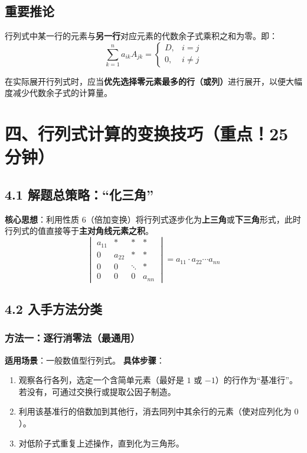 \documentclass{ctexart}
\begin{document}
\subsection{重要推论}
行列式中某一行的元素与\textbf{另一行}对应元素的代数余子式乘积之和为零。即：
\[
\sum_{k=1}^{n} a_{ik}A_{jk} = \begin{cases} D, & i=j \\ 0, & i \neq j \end{cases}
\]

\begin{tipbox}
  在实际展开行列式时，应当\textbf{优先选择零元素最多的行（或列）}进行展开，以便大幅度减少代数余子式的计算量。
\end{tipbox}

\newpage

\section{四、行列式计算的变换技巧（重点！25分钟）}

\subsection{4.1 解题总策略：``化三角''}
\textbf{核心思想}：利用性质 6（倍加变换）将行列式逐步化为\textbf{上三角}或\textbf{下三角}形式，此时行列式的值直接等于\textbf{主对角线元素之积}。
\[
\begin{vmatrix} a_{11} & * & * & * \\ 0 & a_{22} & * & * \\ 0 & 0 & \ddots & * \\ 0 & 0 & 0 & a_{nn} \end{vmatrix} = a_{11} \cdot a_{22} \cdots a_{nn}
\]

\subsection{4.2 入手方法分类}

\subsubsection{方法一：逐行消零法（最通用）}
\textbf{适用场景}：一般数值型行列式。
\textbf{具体步骤}：
\begin{enumerate}
  \item 观察各行各列，选定一个含简单元素（最好是 $1$ 或 $-1$）的行作为``基准行''。若没有，可通过交换行或提取公因子制造。
  \item 利用该基准行的倍数加到其他行，消去同列中其余行的元素（使对应列化为 $0$）。
  \item 对低阶子式重复上述操作，直到化为三角形。
\end{enumerate}
\end{document}
